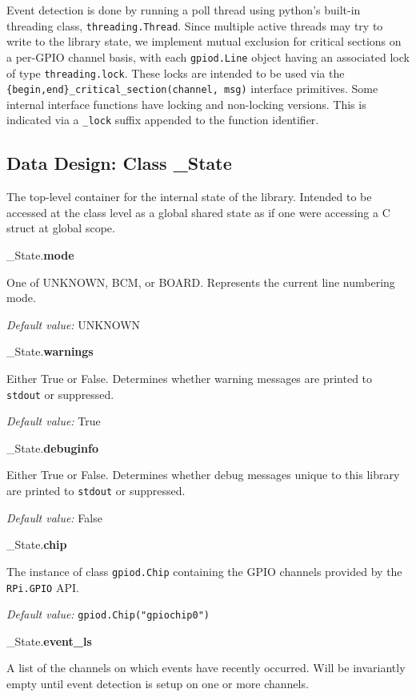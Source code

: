 \documentclass[12pt]{article}
\begin{document}
Event detection is done by running a poll thread using python's built-in threading class, \texttt{threading.Thread}. Since multiple active threads may try to write to the library state, we implement mutual exclusion for critical sections on a per-GPIO channel basis, with each \texttt{gpiod.Line} object having an associated lock of type \texttt{threading.lock}. These locks are intended to be used via the \texttt{\{begin,end\}\_critical\_section(channel, msg)} interface primitives. Some internal interface functions have locking and non-locking versions. This is indicated via a \texttt{\_lock} suffix appended to the function identifier.

\subsection{Data Design: Class \_State} \label{class_state}

The top-level container for the internal state of the library. Intended to be accessed at the class level as a global shared state as if one were accessing a C struct at global scope. 

\medskip

\noindent \_State.\textbf{mode}

One of UNKNOWN, BCM, or BOARD. Represents the current line numbering mode.

\textit{Default value:} UNKNOWN

\noindent \_State.\textbf{warnings}

Either True or False. Determines whether warning messages are printed to \texttt{stdout} or suppressed.

\textit{Default value:} True

\noindent \_State.\textbf{debuginfo}

Either True or False. Determines whether debug messages unique to this library are printed to \texttt{stdout} or suppressed.

\textit{Default value:} False

\noindent \_State.\textbf{chip}

The instance of class \texttt{gpiod.Chip} containing the GPIO channels provided by the \texttt{RPi.GPIO} API.

\textit{Default value:} \texttt{gpiod.Chip("gpiochip0")}

\noindent \_State.\textbf{event\_ls}

A list of the channels on which events have recently occurred. Will be invariantly empty until event detection is setup on one or more channels.
\end{document}
